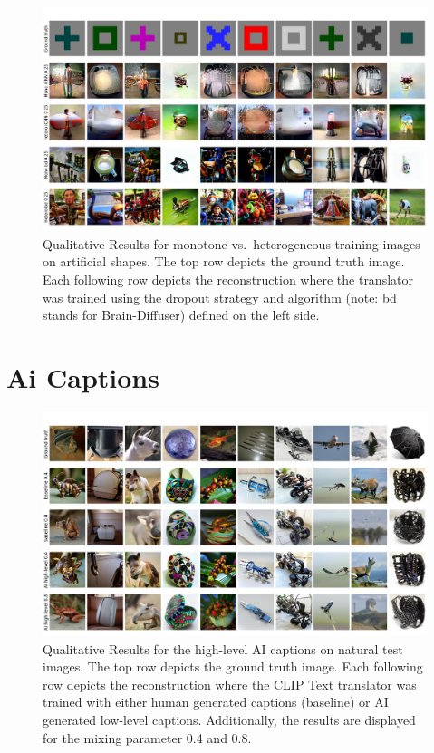  \begin{figure}[H]
   \centering
   \includegraphics[width=1\textwidth]{plots/dropout_discussion_art.JPEG}
   \caption[Reconstructed images with monotonous and heterogeneous training data on artificial shapes]{Qualitative Results for monotone vs.\ heterogeneous training images on artificial shapes. The top row depicts the ground truth image. Each following row depicts the reconstruction where the translator was trained using the dropout strategy and algorithm (note: bd stands for Brain-Diffuser) defined on the left side.}\label{fig:dropout_discussion_art}
 \end{figure}


\section{Ai Captions}

\begin{figure}[H]
   \centering
   \includegraphics[width=1\textwidth]{plots/aicap_qual_test_highlevel_appendix.JPEG}
   \caption[Experiment 2: Reconstructed images for Brain-Diffuser on natural test images with high-level captions]{Qualitative Results for the high-level AI captions on natural test images. The top row depicts the ground truth image. Each following row depicts the reconstruction where the CLIP Text translator was trained with either human generated captions (baseline) or AI generated low-level captions. Additionally, the results are displayed for the mixing parameter 0.4 and 0.8.}\label{fig:aicap_qual_test_highlevel_appendix}
\end{figure}

